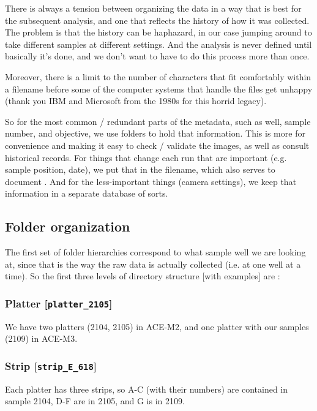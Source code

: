 There is always a tension between organizing the data in a way that is best for
the subsequent analysis, and one that reflects the history of how it was
collected. The problem is that the history can be haphazard, in our case jumping
around to take different samples at different settings. And the analysis is
never defined until basically it's done, and we don't want to have to do this
process more than once.

Moreover, there is a limit to the number of characters that fit comfortably
within a filename before some of the computer systems that handle the files get
unhappy (thank you IBM and Microsoft from the 1980s for this horrid legacy).

So for the most common / redundant parts of the metadata, such as well, sample
number, and objective, we use folders to hold that information. This is more for
convenience and making it easy to check / validate the images, as well as
consult historical records. For things that change each run that are important
(e.g. sample position, date), we put that in the filename, which also serves to
document . And for the less-important things (camera settings), we keep that
information in a separate database of sorts.

\subsection{Folder organization}\hypertarget{folder-organization}{}\label{folder-organization}
The first set of folder hierarchies correspond to what sample well we are
looking at, since that is the way the raw data is actually collected (i.e. at
one well at a time). So the first three levels of directory structure [with
examples] are :

\subsubsection{Platter [{\tt platter\_2105}]}\hypertarget{platter-platter2105}{}\label{platter-platter2105}
We have two platters (2104, 2105) in ACE-M2, and one platter with our samples
(2109) in ACE-M3.

\subsubsection{Strip [{\tt strip\_E\_618}]}\hypertarget{strip-stripe618}{}\label{strip-stripe618}
Each platter has three strips, so A-C (with their numbers) are contained in
sample 2104, D-F are in 2105, and G is in 2109.

